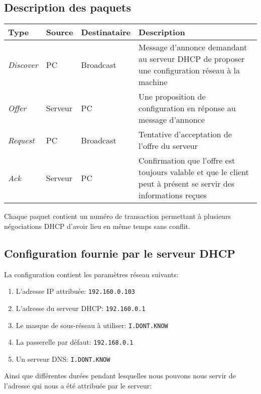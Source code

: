 \documentclass[11pt,a4paper]{article}
\begin{document}
\subsection{Description des paquets}

\begin{tabular}{|l||l|l|p{8.9cm}|}
\hline
	\textbf{Type} & \textbf{Source} & \textbf{Destinataire} & \textbf{Description} \\
\hline
	\textit{Discover} &
	PC & Broadcast &
	Message d'annonce demandant au serveur DHCP de proposer une configuration réseau à la machine \\
\hline
	\textit{Offer} &
	Serveur & PC &
	Une proposition de configuration en réponse au message d'annonce \\
\hline
	\textit{Request} &
	PC & Broadcast &
	Tentative d'acceptation de l'offre du serveur \\
\hline
	\textit{Ack} &
	Serveur & PC &
	Confirmation que l'offre est toujours valable et que le client peut à présent se servir des informations reçues \\
	\hline
\end{tabular}

\vspace{1em}

Chaque paquet contient un numéro de transaction permettant à plusieurs négociations DHCP d'avoir lieu en même temps sans conflit.

\subsection{Configuration fournie par le serveur DHCP}

La configuration contient les paramètres réseau suivants:

\begin{enumerate}
	\item L'adresse IP attribuée: \texttt{192.160.0.103}
	\item L'adresse du serveur DHCP: \texttt{192.160.0.1}
	\item Le masque de sous-réseau à utiliser: \texttt{I.DONT.KNOW}
	\item La passerelle par défaut: \texttt{192.168.0.1}
	\item Un serveur DNS: \texttt{I.DONT.KNOW}
\end{enumerate}

Ainsi que différentes durées pendant lesquelles nous pouvons nous servir de l'adresse qui nous a été attribuée par le serveur:
\end{document}
